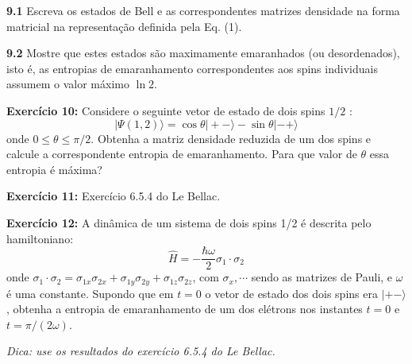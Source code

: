 \documentclass[12pt]{article}
\begin{document}
\textbf{9.1} Escreva os estados de Bell e as correspondentes matrizes densidade na forma matricial na
representação definida pela Eq. (1).

\textbf{9.2 }Mostre que estes estados são maximamente emaranhados (ou desordenados), isto é, as
entropias de emaranhamento correspondentes aos spins individuais assumem o valor máximo \(\ln 2\).

\textbf{Exercício 10:} Considere o seguinte vetor de estado de dois spins \(1 / 2\) :
\[
|\Psi(1,2)\rangle=\cos \theta|+-\rangle-\sin \theta|-+\rangle
\]
onde \(0 \leq \theta \leq \pi / 2\). Obtenha a matriz densidade reduzida de um dos spins e calcule a correspondente entropia de emaranhamento. Para que valor de \(\theta\) essa entropia é máxima?

\textbf{Exercício 11:} Exercício 6.5.4 do Le Bellac.

\textbf{Exercício 12:} A dinâmica de um sistema de dois spins 1/2 é descrita pelo hamiltoniano:
\[
\hat{H}=-\frac{\hbar \omega}{2} \sigma_{1} \cdot \sigma_{2}
\]
onde \(\sigma_{1} \cdot \sigma_{2}=\sigma_{1 x} \sigma_{2 x}+\sigma_{1 y} \sigma_{2 y}+\sigma_{1 z} \sigma_{2 z}\), com \(\sigma_{x}, \cdots\) sendo as matrizes de Pauli, e \(\omega\) é uma
constante. Supondo que em \(t=0\) o vetor de estado dos dois spins era \(|+-\rangle\), obtenha a
entropia de emaranhamento de um dos elétrons nos instantes \(t=0\) e \(t=\pi /(2 \omega)\).

\emph{Dica: use os resultados do exercício 6.5.4 do Le Bellac.}
\end{document}
